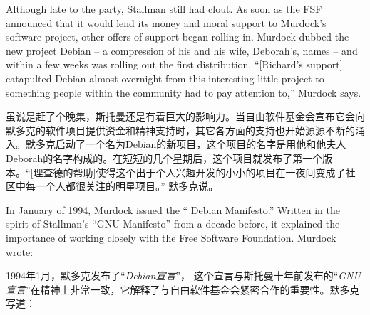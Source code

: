


\ifdefined\eng
Although late to the party, Stallman still had clout. As soon as the FSF announced that it would lend its money and moral support to Murdock's software project, other offers of support began rolling in. Murdock dubbed the new project Debian -- a compression of his and his wife, Deborah's, names -- and within a few weeks was rolling out the first distribution. ``[Richard's support] catapulted Debian almost overnight from this interesting little project to something people within the community had to pay attention to,'' Murdock says.
\fi

\ifdefined\chs
虽说是赶了个晚集，斯托曼还是有着巨大的影响力。当自由软件基金会宣布它会向默多克的软件项目提供资金和精神支持时，其它各方面的支持也开始源源不断的涌入。默多克启动了一个名为Debian的新项目，这个项目的名字是用他和他夫人Deborah的名字构成的。在短短的几个星期后，这个项目就发布了第一个版本。``[理查德的帮助]使得这个出于个人兴趣开发的小小的项目在一夜间变成了社区中每一个人都很关注的明星项目。'' 默多克说。
\fi

\ifdefined\eng
In January of 1994, Murdock issued the `` Debian Manifesto.'' Written in the spirit of Stallman's ``GNU Manifesto'' from a decade before, it explained the importance of working closely with the Free Software Foundation. Murdock wrote:
\fi

\ifdefined\chs
1994年1月，默多克发布了``\textit{Debian宣言}''， 这个宣言与斯托曼十年前发布的``\textit{GNU宣言}''在精神上非常一致，它解释了与自由软件基金会紧密合作的重要性。默多克写道：
\fi

